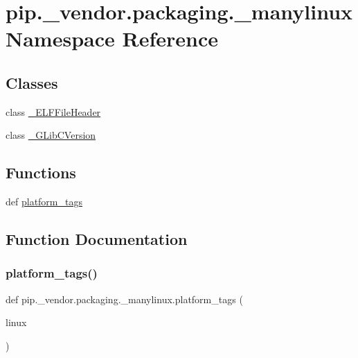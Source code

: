 \hypertarget{namespacepip_1_1__vendor_1_1packaging_1_1__manylinux}{}\section{pip.\+\_\+vendor.\+packaging.\+\_\+manylinux Namespace Reference}
\label{namespacepip_1_1__vendor_1_1packaging_1_1__manylinux}
\subsection*{Classes}
\begin{DoxyCompactItemize}
\item 
class \hyperlink{classpip_1_1__vendor_1_1packaging_1_1__manylinux_1_1__ELFFileHeader}{\+\_\+\+E\+L\+F\+File\+Header}
\item 
class \hyperlink{classpip_1_1__vendor_1_1packaging_1_1__manylinux_1_1__GLibCVersion}{\+\_\+\+G\+Lib\+C\+Version}
\end{DoxyCompactItemize}
\subsection*{Functions}
\begin{DoxyCompactItemize}
\item 
def \hyperlink{namespacepip_1_1__vendor_1_1packaging_1_1__manylinux_a6ad0181fb0aa8bb0a94206f30c2266fd}{platform\+\_\+tags}
\end{DoxyCompactItemize}


\subsection{Function Documentation}
\mbox{\label{namespacepip_1_1__vendor_1_1packaging_1_1__manylinux_a6ad0181fb0aa8bb0a94206f30c2266fd}} 
\subsubsection{\texorpdfstring{platform\+\_\+tags()}{platform\_tags()}}
{\footnotesize\ttfamily def pip.\+\_\+vendor.\+packaging.\+\_\+manylinux.\+platform\+\_\+tags (\begin{DoxyParamCaption}\item[{}]{linux }\end{DoxyParamCaption})}

